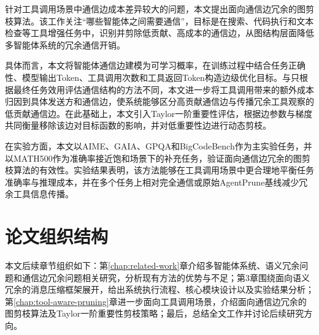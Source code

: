 针对工具调用场景中通信边成本差异较大的问题，本文提出面向通信边冗余的图剪枝算法。该工作关注“哪些智能体之间需要通信”，目标是在搜索、代码执行和文本检查等工具增强任务中，识别并剪除低贡献、高成本的通信边，从图结构层面降低多智能体系统的冗余通信开销。

具体而言，本文将智能体通信边建模为可学习概率，在训练过程中结合任务正确性、模型输出Token、工具调用次数和工具返回Token构造边级优化目标。与只根据最终任务效用评估通信结构的方法不同，本文进一步将工具调用带来的额外成本归因到具体发送方和通信边，使系统能够区分高贡献通信边与传播冗余工具观察的低贡献通信边。在此基础上，本文引入Taylor一阶重要性评估，根据边参数与梯度共同衡量移除该边对目标函数的影响，并对低重要性边进行动态剪枝。

在实验方面，本文以AIME、GAIA、GPQA和BigCodeBench作为主实验任务，并以MATH500作为准确率接近饱和场景下的补充任务，验证面向通信边冗余的图剪枝算法的有效性。实验结果表明，该方法能够在工具调用场景中更合理地平衡任务准确率与推理成本，并在多个任务上相对完全通信或原始AgentPrune基线减少冗余工具信息传播。

\section{论文组织结构}

本文后续章节组织如下：第\ref{chap:related-work}章介绍多智能体系统、语义冗余问题和通信边冗余问题相关研究，分析现有方法的优势与不足；第3章围绕面向语义冗余的消息压缩框架展开，给出系统执行流程、核心模块设计以及实验结果分析；第\ref{chap:tool-aware-pruning}章进一步面向工具调用场景，介绍面向通信边冗余的图剪枝算法及Taylor一阶重要性剪枝策略；最后，总结全文工作并讨论后续研究方向。
